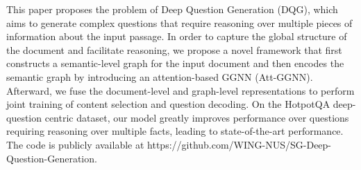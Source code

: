 This paper proposes the problem of Deep Question Generation (DQG), which aims to generate complex questions that require reasoning over multiple pieces of information about the input passage. In order to capture the global structure of the document and facilitate reasoning, we propose a novel framework that first constructs a semantic-level graph for the input document and then encodes the semantic graph by introducing an attention-based GGNN (Att-GGNN). Afterward, we fuse the document-level and graph-level representations to perform joint training of content selection and question decoding. On the HotpotQA deep-question centric dataset, our model greatly improves performance over questions requiring reasoning over multiple facts, leading to state-of-the-art performance. The code is publicly available at https://github.com/WING-NUS/SG-Deep-Question-Generation.
